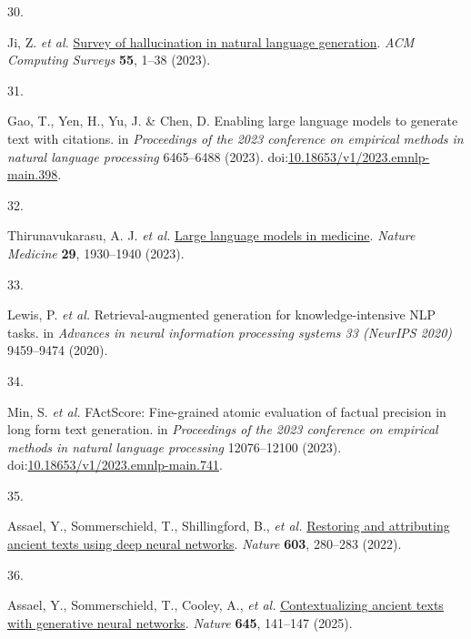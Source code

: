 \documentclass[
]{article}
\newlength{\cslhangindent}
\newlength{\csllabelwidth}
\newlength{\cslentryspacingunit} %
\newenvironment{CSLReferences}[2] %
 {%
  \setlength{\parindent}{0pt}
  \ifodd #1
  \let\oldpar\par
  \def\par{\hangindent=\cslhangindent\oldpar}
  \fi
  \setlength{\parskip}{#2\cslentryspacingunit}
 }%
 {}
\newcommand{\CSLLeftMargin}[1]{\parbox[t]{\csllabelwidth}{#1}}
\newcommand{\CSLRightInline}[1]{\parbox[t]{\linewidth - \csllabelwidth}{#1}\break}
\begin{document}
\begin{CSLReferences}{0}{0}
\leavevmode{}%
\CSLLeftMargin{30. }%
\CSLRightInline{Ji, Z. \emph{et al.}
\href{https://doi.org/10.1145/3571730}{Survey of hallucination in
natural language generation}. \emph{ACM Computing Surveys} \textbf{55},
1--38 (2023).}

\leavevmode{}%
\CSLLeftMargin{31. }%
\CSLRightInline{Gao, T., Yen, H., Yu, J. \& Chen, D. Enabling large
language models to generate text with citations. in \emph{Proceedings of
the 2023 conference on empirical methods in natural language processing}
6465--6488 (2023).
doi:\href{https://doi.org/10.18653/v1/2023.emnlp-main.398}{10.18653/v1/2023.emnlp-main.398}.}

\leavevmode{}%
\CSLLeftMargin{32. }%
\CSLRightInline{Thirunavukarasu, A. J. \emph{et al.}
\href{https://doi.org/10.1038/s41591-023-02448-8}{Large language models
in medicine}. \emph{Nature Medicine} \textbf{29}, 1930--1940 (2023).}

\leavevmode{}%
\CSLLeftMargin{33. }%
\CSLRightInline{Lewis, P. \emph{et al.} Retrieval-augmented generation
for knowledge-intensive {NLP} tasks. in \emph{Advances in neural
information processing systems 33 (NeurIPS 2020)} 9459--9474 (2020).}

\leavevmode{}%
\CSLLeftMargin{34. }%
\CSLRightInline{Min, S. \emph{et al.} {FActScore}: Fine-grained atomic
evaluation of factual precision in long form text generation. in
\emph{Proceedings of the 2023 conference on empirical methods in natural
language processing} 12076--12100 (2023).
doi:\href{https://doi.org/10.18653/v1/2023.emnlp-main.741}{10.18653/v1/2023.emnlp-main.741}.}

\leavevmode{}%
\CSLLeftMargin{35. }%
\CSLRightInline{Assael, Y., Sommerschield, T., Shillingford, B.,
\emph{et al.}
\href{https://doi.org/10.1038/s41586-022-04448-z}{Restoring and
attributing ancient texts using deep neural networks}. \emph{Nature}
\textbf{603}, 280--283 (2022).}

\leavevmode{}%
\CSLLeftMargin{36. }%
\CSLRightInline{Assael, Y., Sommerschield, T., Cooley, A., \emph{et al.}
\href{https://doi.org/10.1038/s41586-025-09292-5}{Contextualizing
ancient texts with generative neural networks}. \emph{Nature}
\textbf{645}, 141--147 (2025).}


\end{CSLReferences}
\end{document}
